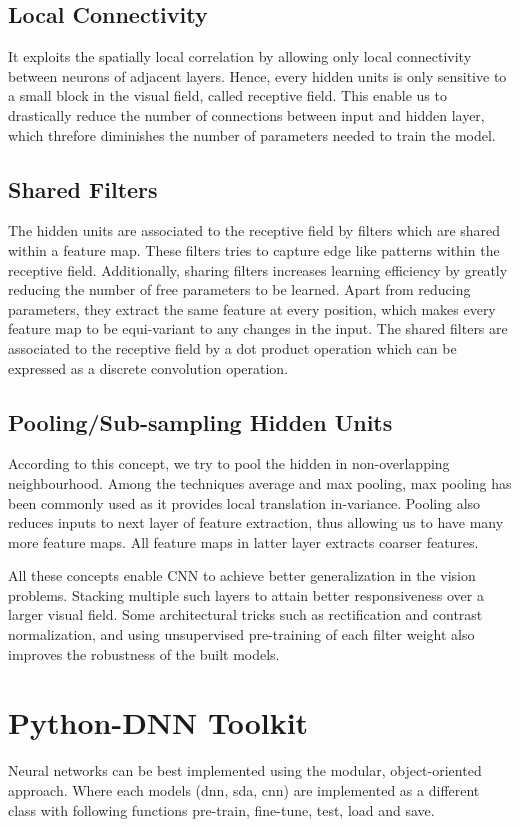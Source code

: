 \subsection{Local Connectivity}
It exploits the spatially local correlation by  allowing only local connectivity between neurons of adjacent layers. Hence, every hidden units is only sensitive to a small block in the visual field, called receptive field. This enable us to  drastically reduce the number of connections between input and hidden layer, which threfore diminishes the number of parameters needed to train the model.
\subsection{Shared Filters}
The hidden units are associated to the receptive field by filters which are shared within a feature map. These filters tries to capture edge like patterns within the receptive field. Additionally, sharing filters increases learning efficiency by greatly reducing the number of free parameters to be learned. Apart from reducing parameters, they extract the same feature at every position, which makes every feature map to be equi-variant to any changes in the input. The shared filters are associated to the receptive field by a dot product operation which can be expressed as a discrete convolution operation.
\subsection{Pooling/Sub-sampling Hidden Units}
According to this concept, we try to pool the hidden in non-overlapping neighbourhood. Among the techniques average and max pooling, max pooling has been commonly used as it provides local translation in-variance. Pooling also reduces inputs to next layer of feature extraction, thus allowing us to have many more feature maps. All feature maps in latter layer extracts coarser features.\par
All these concepts enable CNN to achieve better generalization in the vision problems. Stacking multiple such layers to attain better responsiveness over a larger visual field. Some architectural tricks such as rectification and contrast normalization, and using unsupervised pre-training of each filter weight also improves the robustness of the built models.
\section{Python-DNN Toolkit}
 \label{sec:pyDNN}
Neural networks can be best implemented using the modular, object-oriented approach. Where each models (dnn, sda, cnn) are implemented as a different class with following functions pre-train, fine-tune, test, load and save.



